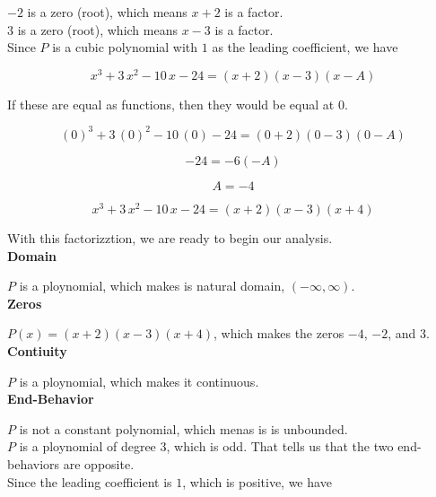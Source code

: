 \documentclass{ximera}
\begin{document}
$-2$ is a zero (root), which means $x+2$ is a factor. \\

$3$ is a zero (root), which means $x-3$ is a factor. \\


Since $P$ is a cubic polynomial with $1$ as the leading coefficient, we have

\[
x^3 + 3 \, x^2 - 10 \, x - 24 = (x+2) (x-3) (x-A)
\]

If these are equal as functions, then they would be equal at $0$.


\[
(0)^3 + 3 \, (0)^2 - 10 \, (0) - 24 = (0+2) (0-3) (0-A)
\]


\[
-24 = -6 (-A)
\]


\[
A = -4
\]



\[
x^3 + 3 \, x^2 - 10 \, x - 24 = (x+2) (x-3) (x+4)
\]



With this factorizztion, we are ready to begin our analysis. \\



\textbf{Domain}

$P$ is a ploynomial, which makes is natural domain, $(-\infty, \infty)$. \\





\textbf{Zeros}

$P(x) = (x+2) (x-3) (x+4)$, which makes the zeros $-4$, $-2$, and $3$. \\





\textbf{Contiuity}

$P$ is a ploynomial, which makes it continuous. \\







\textbf{End-Behavior}


$P$ is not a constant polynomial, which menas is is unbounded. \\

$P$ is a ploynomial of degree $3$, which is odd.  That tells us that the two end-behaviors are opposite. \\

Since the leading coefficient is $1$, which is positive, we have
\end{document}
